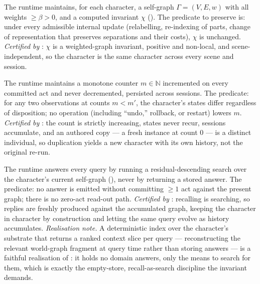 \documentclass[11pt,twocolumn,a4paper]{article}
\newcommand{\N}{\mathbb{N}}
\newcommand{\Self}{\Gamma}          %
\newcommand{\V}{V}
\newcommand{\E}{E}
\newcommand{\wt}{w}
\newcommand{\floorc}{\beta}          %
\newcommand{\Char}{\chi}             %
\newcommand{\cnt}{m}                 %
\begin{document}
\begin{binv}
\label{inv:identity}
The runtime maintains, for each character, a self-graph
$\Self=(\V,\E,\wt)$ with all weights $\ge\floorc>0$, and a computed
invariant $\Char$ (). The predicate to preserve is: under
every admissible internal update (relabelling, re-indexing of parts,
change of representation that preserves separations and their costs),
$\Char$ is unchanged. \emph{Certified by} : $\Char$ is
a weighted-graph invariant, positive and non-local, and scene-independent,
so the character is the same character across every scene and session.
\end{binv}

\begin{binv}
\label{inv:count}
The runtime maintains a monotone counter $\cnt\in\N$ incremented on
every committed act and never decremented, persisted across sessions. The
predicate: for any two observations at counts $\cnt<\cnt'$, the
character's states differ regardless of disposition; no operation
(including ``undo,'' rollback, or restart) lowers $\cnt$. \emph{Certified
by} : the count is strictly increasing, states never
recur, sessions accumulate, and an authored copy --- a fresh instance at
count $0$ --- is a distinct individual, so duplication yields a new
character with its own history, not the original re-run.
\end{binv}

\begin{binv}
\label{inv:search}
The runtime answers every query by running a residual-descending search
over the character's current self-graph (), never by
returning a stored answer. The predicate: no answer is emitted without
committing $\ge1$ act against the present graph; there is no zero-act
read-out path. \emph{Certified by} : recalling is
searching, so replies are freshly produced against the accumulated graph,
keeping the character in character by construction and letting the same
query evolve as history accumulates. \emph{Realisation note.} A
deterministic index over the character's substrate that returns a ranked
context slice per query --- reconstructing the relevant world-graph
fragment at query time rather than storing answers --- is a faithful
realisation of : it holds no domain answers, only the
means to search for them, which is exactly the empty-store,
recall-as-search discipline the invariant demands.
\end{binv}
\end{document}

